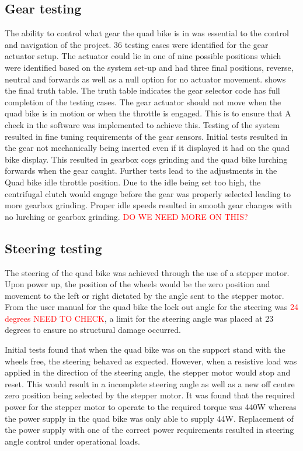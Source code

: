 \documentclass[main.tex]{subfiles}
\begin{document}
\subsection{Gear testing}
The ability to control what gear the quad bike is in was essential to the control and navigation of the project. 36 testing cases were identified for the gear actuator setup. The actuator could lie in one of nine possible positions which were identified based on the system set-up and had three final positions, reverse, neutral and forwards as well as a null option for no actuator movement.  shows the final truth table.
The truth table indicates the gear selector code has full completion of the testing cases. The gear actuator should not move when the quad bike is in motion or when the throttle is engaged. This is to ensure that   A check in the software was implemented to achieve this. Testing of the system resulted in fine tuning requirements of the gear sensors. Initial tests resulted in the gear not mechanically being inserted even if it displayed it had on the quad bike display. This resulted in gearbox cogs grinding and the quad bike lurching forwards when the gear caught. Further tests lead to the adjustments in the Quad bike idle throttle position. Due to the idle being set too high, the centrifugal clutch would engage before the gear was properly selected leading to more gearbox grinding. Proper idle speeds resulted in smooth gear changes with no lurching or gearbox grinding.   \textcolor{red}{DO WE NEED MORE ON THIS?}

\subsection{Steering testing}
The steering of the quad bike was achieved through the use of a stepper motor. Upon power up, the position of the wheels would be the zero position and movement to the left or right dictated by the angle sent to the stepper motor. From the user manual for the quad bike the lock out angle for the steering was \textcolor{red}{24 degrees NEED TO CHECK}, a limit for the steering angle was placed at 23 degrees to ensure no structural damage occurred. 

Initial tests found that when the quad bike was on the support stand with the wheels free, the steering behaved as expected. However, when a resistive load was applied in the direction of the steering angle, the stepper motor would stop and reset. This would result in a incomplete steering angle as well as a new off centre zero position being selected by the stepper motor.  It was found that the required power for the stepper motor to operate to the required torque was 440W whereas the power supply in the quad bike was only able to supply 44W. Replacement of the power supply with one of the correct power requirements resulted in steering angle control under operational loads.
\end{document}
